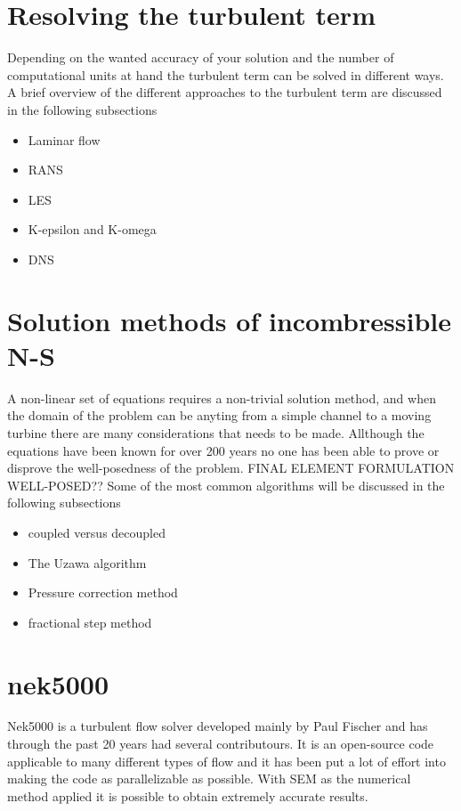 \section{Resolving the turbulent term}
Depending on the wanted accuracy of your solution and the number of computational units at hand the turbulent term can be solved in 
different ways. A brief overview of the different approaches to the turbulent term are discussed in the following subsections

\begin{itemize}
	\item Laminar flow
	\item RANS
	\item LES
	\item K-epsilon and K-omega
	\item DNS
\end{itemize}

\section{Solution methods of incombressible N-S}
A non-linear set of equations requires a non-trivial solution method, and when the domain of the problem can be anyting from a simple channel 
to a moving turbine there are many considerations that needs to be made. Allthough the equations have been known for over 200 years no one 
has been able to prove or disprove the well-posedness of the problem. FINAL ELEMENT FORMULATION WELL-POSED?? Some of the most common algorithms 
will be discussed in the following subsections

\begin{itemize}
\item coupled versus decoupled 
\item The Uzawa algorithm 
\item Pressure correction method
\item fractional step method
\end{itemize}

\section{nek5000}
Nek5000 is a turbulent flow solver developed mainly by Paul Fischer and has through the past 20 years had several contributours. 
It is an open-source code applicable to many different types of flow and it has been put a lot of effort into making the code as 
parallelizable as possible. With SEM as the numerical method applied it is possible to obtain extremely accurate results.  

